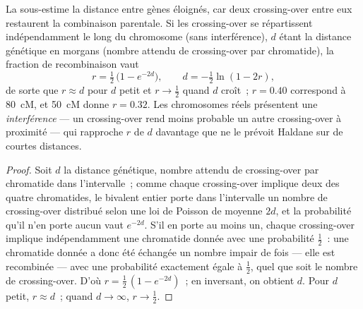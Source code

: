 \begin{theorem}\label{thm:b2:meiosis-heredity:haldane}
La  sous-estime la distance entre gènes
éloignés, car deux crossing-over entre eux restaurent la combinaison
parentale. Si les crossing-over se répartissent indépendamment le long
du chromosome (sans interférence), $d$ étant la distance génétique en
morgans (nombre attendu de crossing-over par chromatide), la fraction
de recombinaison vaut
\[
r = \tfrac12\,\bigl(1 - e^{-2d}\bigr), \qquad d = -\tfrac12\ln(1 - 2r),
\]
de sorte que $r \approx d$ pour $d$ petit et $r \to \tfrac12$ quand $d$
croît~; $r = 0.40$ correspond à \qty{80}{cM}, et \qty{50}{cM}
donne $r = 0.32$. Les chromosomes réels présentent une
\emph{interférence} --- un crossing-over rend moins probable un autre
crossing-over à proximité --- qui rapproche $r$ de $d$ davantage que ne
le prévoit Haldane sur de courtes distances.
\end{theorem}
\begin{proof}
Soit $d$ la distance génétique, nombre attendu de crossing-over par
chromatide dans l'intervalle~; comme chaque crossing-over implique deux
des quatre chromatides, le bivalent entier porte dans l'intervalle un
nombre de crossing-over distribué selon une loi de Poisson de moyenne
$2d$, et la probabilité qu'il n'en porte aucun vaut $e^{-2d}$. S'il en
porte au moins un, chaque crossing-over implique indépendamment une
chromatide donnée avec une probabilité
$\tfrac12$~: une chromatide donnée a donc été échangée un nombre impair
de fois --- elle est recombinée --- avec une probabilité exactement
égale à $\tfrac12$, quel que soit le nombre de crossing-over. D'où $r = \tfrac12\,(1 -
e^{-2d})$~; en inversant, on obtient $d$. Pour $d$ petit, $r \approx d$~;
quand $d \to \infty$, $r \to \tfrac12$.
\end{proof}

